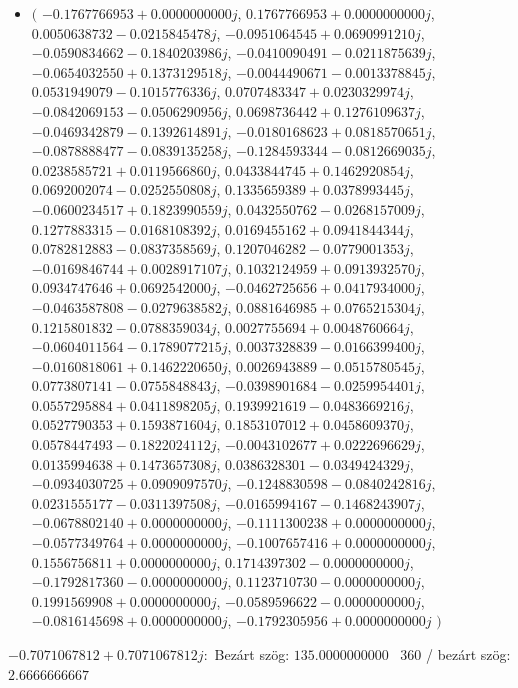 \documentclass[14pt,a4paper]{article}
\begin{document}
\begin{itemize}
\item
$\big($
$-0.1767766953+0.0000000000j$, $0.1767766953+0.0000000000j$, $0.0050638732-0.0215845478j$, $-0.0951064545+0.0690991210j$, $-0.0590834662-0.1840203986j$, $-0.0410090491-0.0211875639j$, $-0.0654032550+0.1373129518j$, $-0.0044490671-0.0013378845j$, $0.0531949079-0.1015776336j$, $0.0707483347+0.0230329974j$, $-0.0842069153-0.0506290956j$, $0.0698736442+0.1276109637j$, $-0.0469342879-0.1392614891j$, $-0.0180168623+0.0818570651j$, $-0.0878888477-0.0839135258j$, $-0.1284593344-0.0812669035j$, $0.0238585721+0.0119566860j$, $0.0433844745+0.1462920854j$, $0.0692002074-0.0252550808j$, $0.1335659389+0.0378993445j$, $-0.0600234517+0.1823990559j$, $0.0432550762-0.0268157009j$, $0.1277883315-0.0168108392j$, $0.0169455162+0.0941844344j$, $0.0782812883-0.0837358569j$, $0.1207046282-0.0779001353j$, $-0.0169846744+0.0028917107j$, $0.1032124959+0.0913932570j$, $0.0934747646+0.0692542000j$, $-0.0462725656+0.0417934000j$, $-0.0463587808-0.0279638582j$, $0.0881646985+0.0765215304j$, $0.1215801832-0.0788359034j$, $0.0027755694+0.0048760664j$, $-0.0604011564-0.1789077215j$, $0.0037328839-0.0166399400j$, $-0.0160818061+0.1462220650j$, $0.0026943889-0.0515780545j$, $0.0773807141-0.0755848843j$, $-0.0398901684-0.0259954401j$, $0.0557295884+0.0411898205j$, $0.1939921619-0.0483669216j$, $0.0527790353+0.1593871604j$, $0.1853107012+0.0458609370j$, $0.0578447493-0.1822024112j$, $-0.0043102677+0.0222696629j$, $0.0135994638+0.1473657308j$, $0.0386328301-0.0349424329j$, $-0.0934030725+0.0909097570j$, $-0.1248830598-0.0840242816j$, $0.0231555177-0.0311397508j$, $-0.0165994167-0.1468243907j$, $-0.0678802140+0.0000000000j$, $-0.1111300238+0.0000000000j$, $-0.0577349764+0.0000000000j$, $-0.1007657416+0.0000000000j$, $0.1556756811+0.0000000000j$, $0.1714397302-0.0000000000j$, $-0.1792817360-0.0000000000j$, $0.1123710730-0.0000000000j$, $0.1991569908+0.0000000000j$, $-0.0589596622-0.0000000000j$, $-0.0816145698+0.0000000000j$, $-0.1792305956+0.0000000000j$
$\big)$
\end{itemize}
$-0.7071067812+0.7071067812j$:\
Bezárt szög: $135.0000000000$ \
360 / bezárt szög: $2.6666666667$\
\end{document}
